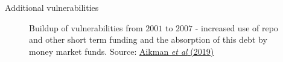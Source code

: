 

\begin{frame}{Additional vulnerabilities}

\begin{figure}
\begin{center}


\caption{\label{fig:L4_aikman_et_al_short_term_funding} Buildup of vulnerabilities from $2001$ to $2007$ - increased use of repo and other short term funding and the absorption of this debt by money market funds. Source: \href{https://pubs.aeaweb.org/doi/pdfplus/10.1257/jep.33.1.107}{Aikman \emph{et al} (2019)}}

\end{center}
\end{figure}


\end{frame}
